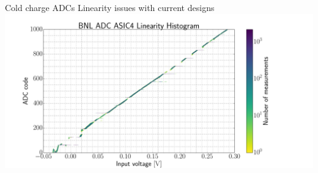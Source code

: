 \documentclass[]{beamer}
\newcommand*{\emphcoltitle}{blue}
\begin{document}
\begin{frame}{Cold charge ADCs}{\color{\emphcoltitle} Linearity issues with current designs}
	\centering
	\includegraphics[height=.8\textheight]{bnl/bnl_adc_lin}
\end{frame}
\end{document}
